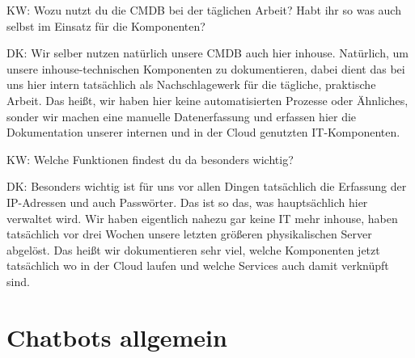 \begin{list}{X:}{\setlength{\labelsep}{5mm}}
\item[KW:] Wozu nutzt du die CMDB bei der täglichen Arbeit? Habt ihr so was auch selbst im Einsatz für die Komponenten?
\item[DK:] Wir selber nutzen natürlich unsere CMDB auch hier inhouse. Natürlich, um unsere inhouse-technischen Komponenten zu dokumentieren, dabei dient das bei uns hier intern tatsächlich als Nachschlagewerk für die tägliche, praktische Arbeit. Das heißt, wir haben hier keine automatisierten Prozesse oder Ähnliches, sonder wir machen eine manuelle Datenerfassung und erfassen hier die Dokumentation unserer internen und in der Cloud genutzten IT-Komponenten.
\item[KW:] Welche Funktionen findest du da besonders wichtig?
\item[DK:] Besonders wichtig ist für uns vor allen Dingen tatsächlich die Erfassung der IP-Adressen und auch Passwörter. Das ist so das, was hauptsächlich hier verwaltet wird. Wir haben eigentlich nahezu gar keine IT mehr inhouse, haben tatsächlich vor drei Wochen unsere letzten größeren physikalischen Server abgelöst. Das heißt wir dokumentieren sehr viel, welche Komponenten jetzt tatsächlich wo in der Cloud laufen und welche Services auch damit verknüpft sind.
\end{list}

\section*{Chatbots allgemein}

